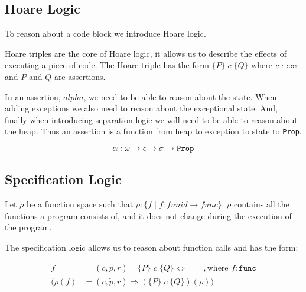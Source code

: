 \subsection{Hoare Logic}
To reason about a code block we introduce Hoare logic.

Hoare triples are the core of Hoare logic, it allows us to describe the effects of executing a piece of code. The Hoare triple has the form $\{P\}\;c\;\{Q\}$ where $c : \verb|com|$ and $P$ and $Q$ are assertions.

In an assertion, $alpha$, we need to be able to reason about the state. When adding exceptions we also need to reason about the exceptional state. And, finally when introducing separation logic we will need to be able to reason about the heap. Thus an assertion is a function from heap to exception to state to \verb|Prop|.

\begin{equation}\label{eqn:alpha-type}
\alpha: \omega \rightarrow \epsilon \rightarrow \sigma \rightarrow \verb|Prop|
\end{equation}


\subsection{Specification Logic}
Let $\rho$ be a function space such that $\rho : \{f \; | \; f: funid \rightarrow func\}$. $\rho$ contains all the functions a program consists of, and it does not change during the execution of the program.

The specification logic allows us to reason about function calls and has the form:

\begin{equation}
\begin{split}
f &= (c,\tilde{p},r) \vdash \{P\} \; c \; \{Q\} \Leftrightarrow \qquad, \text{where } f : \texttt{func}\\
(\rho(f) &= (c,\tilde{p},r) \Rightarrow (\{P\} \; c \; \{Q\})(\rho))
\end{split} 
\end{equation}
